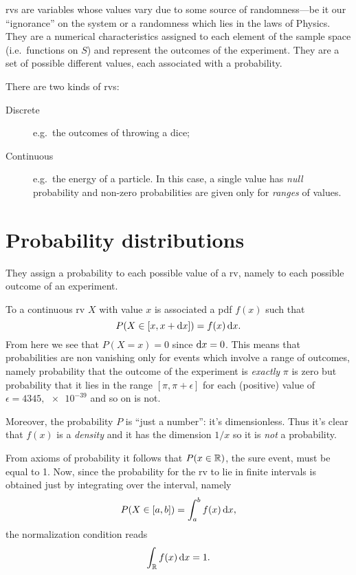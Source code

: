 \documentclass[
	10pt,
	draft
]{scrreprt}
\begin{document}
\acp{rv} are variables whose values vary due to some source of randomness---be it our ``ignorance'' on the system or a randomness which lies in the laws of Physics.
They are a numerical characteristics assigned to each element of the sample space (i.e.~functions on $S$) and represent the outcomes of the experiment.
They are a set of possible different values, each associated with a probability.

There are two kinds of \acp{rv}:
\begin{description}
	\item[Discrete] e.g.~the outcomes of throwing a dice;
	\item[Continuous] e.g.~the energy of a particle. In this case, a single value has \emph{null} probability and non-zero probabilities are given only for \emph{ranges} of values.
\end{description}

		\section{Probability distributions}

They assign a probability to each possible value of a \ac{rv}, namely to each possible outcome of an experiment.





To a continuous \ac{rv} $X$ with value $x$ is associated a \ac{pdf} $f(x)$ such that
\begin{equation}
P(X\in[x,x+\mathop{}\!\mathrm{d} x]) = f(x)\mathop{}\!\mathrm{d} x.
\end{equation}
From here we see that $P(X=x) = 0$ since $\mathop{}\!\mathrm{d} x = 0$.
This means that probabilities are non vanishing only for events which involve a range of outcomes, namely probability that the outcome of the experiment is \emph{exactly} $\pi$ is zero but probability that it lies in the range $[\pi,\pi+\epsilon]$ for each (positive) value of $\epsilon = \num{4345}, \num{e-39}$ and so on is not.


Moreover, the probability $P$ is ``just a number'': it's dimensionless.
Thus it's clear that $f(x)$ is a \emph{density} and it has the dimension $1/x$ so it is \emph{not} a probability.


From axioms of probability it follows that $P(x\in\mathbb{R})$, the sure event, must be equal to \num{1}.
Now, since the probability for the \ac{rv} to lie in finite intervals is obtained just by integrating over the interval, namely
\begin{equation}
P( X \in [a,b] ) = \int_a^b f(x)\mathop{}\!\mathrm{d} x,
\end{equation}
the normalization condition reads
\begin{equation}
\int_{\mathbb{R}} f(x)\mathop{}\!\mathrm{d} x = 1.
\end{equation}
\end{document}
